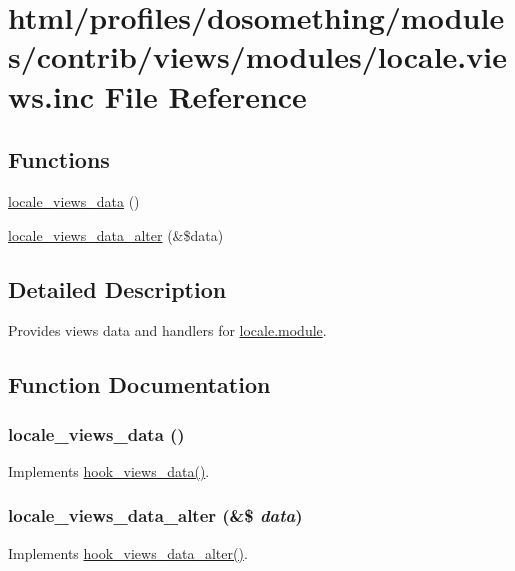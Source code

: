 \hypertarget{locale_8views_8inc}{
\section{html/profiles/dosomething/modules/contrib/views/modules/locale.views.inc File Reference}
\label{locale_8views_8inc}
}
\subsection*{Functions}
\begin{DoxyCompactItemize}
\item 
\hyperlink{locale_8views_8inc_aa2e7c82021bc70c0e3842e8430318690}{locale\_\-views\_\-data} ()
\item 
\hyperlink{locale_8views_8inc_ad47c0998c2231ae085499daa6273eea4}{locale\_\-views\_\-data\_\-alter} (\&\$data)
\end{DoxyCompactItemize}


\subsection{Detailed Description}
Provides views data and handlers for \hyperlink{locale_8module}{locale.module}. 

\subsection{Function Documentation}
\hypertarget{locale_8views_8inc_aa2e7c82021bc70c0e3842e8430318690}{
\subsubsection[{locale\_\-views\_\-data}]{\setlength{\rightskip}{0pt plus 5cm}locale\_\-views\_\-data ()}}
\label{locale_8views_8inc_aa2e7c82021bc70c0e3842e8430318690}
Implements \hyperlink{group__views__hooks_ga227057901681e4a33e33c199c7a8c989}{hook\_\-views\_\-data()}. \hypertarget{locale_8views_8inc_ad47c0998c2231ae085499daa6273eea4}{
\subsubsection[{locale\_\-views\_\-data\_\-alter}]{\setlength{\rightskip}{0pt plus 5cm}locale\_\-views\_\-data\_\-alter (\&\$ {\em data})}}
\label{locale_8views_8inc_ad47c0998c2231ae085499daa6273eea4}
Implements \hyperlink{group__views__hooks_ga6ae0bb0d2385e03c32b57625b6d35826}{hook\_\-views\_\-data\_\-alter()}. 